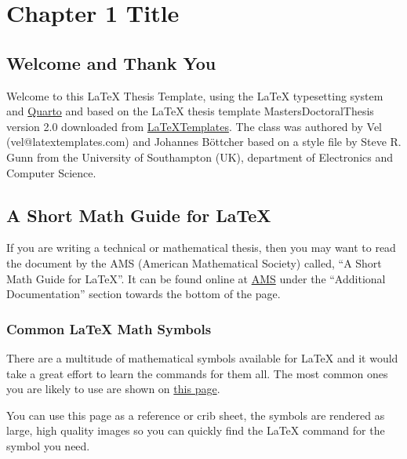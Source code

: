 \documentclass[
  letterpaper,
  12pt,
  oneside,
  spanish,
  doublespacing,
  headsepline,
  parskip]{MastersDoctoralThesis}
\begin{document}

\hypertarget{sec-Chapter1}{%
\chapter{Chapter 1 Title}\label{sec-Chapter1}}

\hypertarget{welcome-and-thank-you}{%
\section{Welcome and Thank You}\label{welcome-and-thank-you}}

Welcome to this \LaTeX{} Thesis Template, using the \LaTeX{} typesetting
system and \href{quarto.org}{Quarto} and based on the \LaTeX{} thesis
template MastersDoctoralThesis version 2.0 downloaded from
\href{http://www.LaTeXTemplates.com}{LaTeXTemplates}. The class was
authored by Vel (vel@latextemplates.com) and Johannes Böttcher based on
a style file by Steve R. Gunn from the University of Southampton (UK),
department of Electronics and Computer Science.

\hypertarget{a-short-math-guide-for}{%
\section{\texorpdfstring{A Short Math Guide for
\LaTeX{}}{A Short Math Guide for }}\label{a-short-math-guide-for}}

If you are writing a technical or mathematical thesis, then you may want
to read the document by the AMS (American Mathematical Society) called,
\enquote{A Short Math Guide for \LaTeX{}}. It can be found online at
\href{http://www.ams.org/tex/amslatex.html}{AMS} under the
\enquote{Additional Documentation} section towards the bottom of the
page.

\hypertarget{common-math-symbols}{%
\subsection{\texorpdfstring{Common \LaTeX{} Math
Symbols}{Common  Math Symbols}}\label{common-math-symbols}}

There are a multitude of mathematical symbols available for \LaTeX{} and
it would take a great effort to learn the commands for them all. The
most common ones you are likely to use are shown on
\href{http://www.sunilpatel.co.uk/latex-type/latex-math-symbols/}{this
page}.

You can use this page as a reference or crib sheet, the symbols are
rendered as large, high quality images so you can quickly find the
\LaTeX{} command for the symbol you need.
\end{document}
